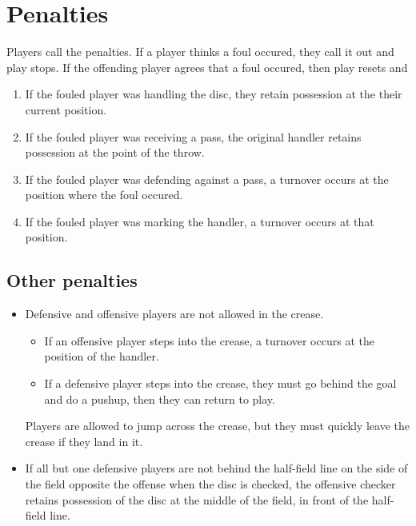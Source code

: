 \documentclass[10pt]{article}
\begin{document}
    \section{Penalties}

        Players call the penalties. If a player thinks a foul occured, they call it out and play stops. If the offending player agrees that a foul occured, then play resets and 
        \begin{enumerate}
            \item If the fouled player was handling the disc, they retain possession at the their current position.
            \item If the fouled player was receiving a pass, the original handler retains possession at the point of the throw.
            \item If the fouled player was defending against a pass, a turnover occurs at the position where the foul occured.
            \item If the fouled player was marking the handler, a turnover occurs at that position.
        \end{enumerate}

        \subsection{Other penalties}
            \begin{itemize}
                \item Defensive and offensive players are not allowed in the crease. 
                \begin{itemize}
                    \item If an offensive player steps into the crease, a turnover occurs at the position of the handler.
                    \item If a defensive player steps into the crease, they must go behind the goal and do a pushup, then they can return to play.
                \end{itemize}
                Players are allowed to jump across the crease, but they must quickly leave the crease if they land in it.
                \item If all but one defensive players are not behind the half-field line on the side of the field opposite the offense when the disc is checked, the offensive checker retains possession of the disc at the middle of the field, in front of the half-field line.
            \end{itemize}
\end{document}
